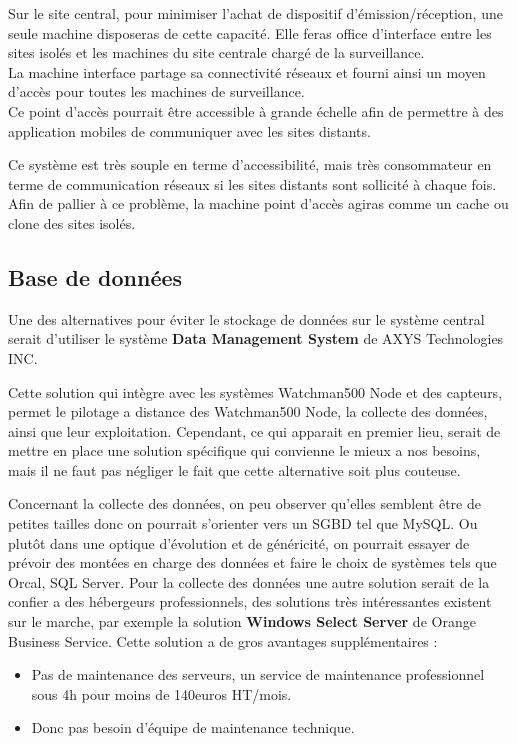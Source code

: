         Sur le site central, pour minimiser l'achat de dispositif d'émission/réception, une seule machine disposeras de cette capacité.
        Elle feras office d'interface entre les sites isolés et les machines du site centrale chargé de la surveillance.\\
        La machine interface partage sa connectivité réseaux et fourni ainsi un moyen d'accès pour toutes les machines de surveillance.\\
        
        Ce point d'accès pourrait être accessible à grande échelle afin de permettre à des application mobiles de communiquer avec les sites distants.
        
        Ce système est très souple en terme d'accessibilité, mais très consommateur en terme de communication réseaux si les sites distants sont sollicité à chaque fois.
        Afin de pallier à ce problème, la machine point d'accès agiras comme un cache ou clone des sites isolés.

    \subsection{Base de données}

		Une des alternatives pour éviter le stockage de données sur le système central serait d'utiliser le système \textbf{Data Management System} de AXYS Technologies INC.


        {Cette solution qui intègre avec les systèmes Watchman500 Node et des capteurs, permet le pilotage a distance des Watchman500 Node, la collecte des données, ainsi que leur exploitation.}
        {}
        {}
        {}
        {}
        {Cependant, ce qui apparait en premier lieu, serait de mettre en place une solution spécifique qui convienne le mieux a nos besoins, mais il ne faut pas négliger le fait que cette alternative soit plus couteuse.}

		        Concernant la collecte des données, on peu observer qu'elles semblent être de petites tailles donc on pourrait s'orienter vers un SGBD tel que MySQL. Ou plutôt dans une optique d'évolution et de généricité, on pourrait essayer de prévoir des montées en charge des données et faire le choix de systèmes tels que Orcal, SQL Server.
		        Pour la collecte des données une autre solution serait de la confier a des hébergeurs professionnels, des solutions très intéressantes existent sur le marche, par exemple la solution \textbf{Windows Select Server} de Orange Business Service. Cette solution a de gros avantages supplémentaires :
		        \begin{itemize}
				        \item Pas de maintenance des serveurs, un service de maintenance professionnel sous 4h pour moins de 140euros HT/mois.
				        \item Donc pas besoin d'équipe de maintenance technique.
		        \end{itemize}

